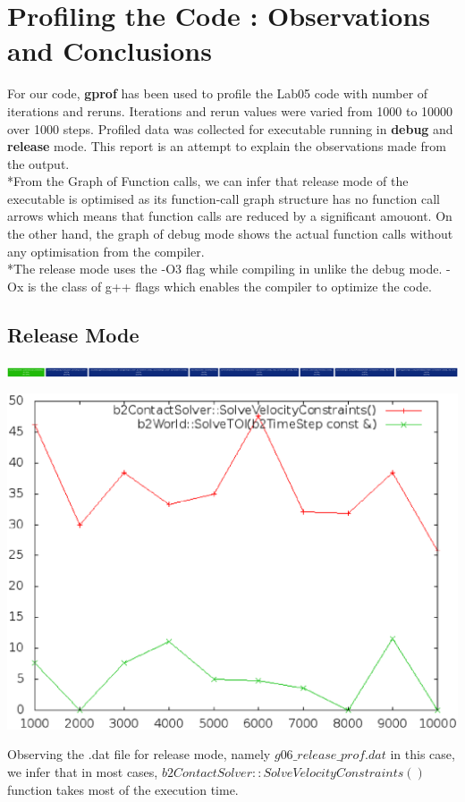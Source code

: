 \documentclass[10pt]{article}
\begin{document}
\section{Profiling the Code : Observations and Conclusions}
For our code, \textbf{gprof} has been used to profile the Lab05 code with number of iterations and reruns. Iterations and rerun values were varied from 1000 to 10000 over 1000 steps. Profiled data was collected for executable running in \textbf{debug} and \textbf{release} mode. This report is an attempt to explain the observations made from the output.
\\*From the Graph of Function calls, we can infer that release mode of the executable is optimised as its function-call graph structure has no function call arrows which means that function calls are reduced by a significant amouont. On the other hand, the graph of debug mode shows the actual function calls without any optimisation from the compiler.
\\*The release mode uses the -O3 flag while compiling in unlike the debug mode. -Ox is the class of g++ flags which enables the compiler to optimize the code. 

\subsection{Release Mode}
\includegraphics[scale=0.15]{release}
\begin{center}
\includegraphics[scale=0.4]{release1}
\end{center}
Observing the .dat file for release mode, namely $g06\_release\_prof.dat$ in this case, we infer that in most cases, $b2ContactSolver::SolveVelocityConstraints()$ function takes most of the execution time.
\end{document}
